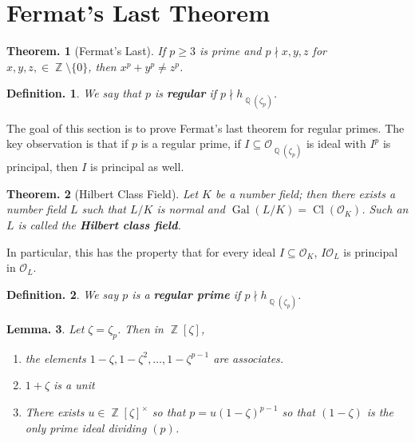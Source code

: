 \documentclass[11pt, a4paper]{memoir}
\DeclareMathOperator{\Q}{{\mathbb{Q}}}
\DeclareMathOperator{\Z}{{\mathbb{Z}}}
\theoremstyle{change}
\newtheorem{theorem}{Theorem.}[section]
\newtheorem{lemma}[theorem]{Lemma.}
\theoremstyle{plain}
\theoremstyle{nonumberplain}
\newtheorem{definition}{Definition.}
\DeclareMathOperator{\Gal}{Gal}
\DeclareMathOperator{\Cl}{Cl}
\newcommand{\mbf}[1]{{\boldmath\bfseries #1}}
\numberwithin{equation}{section}
\begin{document}
\section{Fermat's Last Theorem}
\begin{theorem}[Fermat's Last]
    If $p\geq 3$ is prime and $p\nmid x,y,z$ for $x,y,z,\in\Z\setminus\{0\}$, then $x^p+y^p\neq z^p$.
\end{theorem}
\begin{definition}
    We say that $p$ is \textbf{regular} if $p\nmid h_{\Q(\zeta_p)}$.
\end{definition}
The goal of this section is to prove Fermat's last theorem for regular primes.
The key observation is that if $p$ is a regular prime, if $I\subseteq\mathcal{O}_{\Q(\zeta_p)}$ is ideal with $I^p$ is principal, then $I$ is principal as well.
\begin{theorem}[Hilbert Class Field]
    Let $K$ be a number field; then there exists a number field $L$ such that $L/K$ is normal and $\Gal(L/K)=\Cl(\mathcal{O}_K)$.
    Such an $L$ is called the \textbf{Hilbert class field}.
\end{theorem}
In particular, this has the property that for every ideal $I\subseteq\mathcal{O}_K$, $I\mathcal{O}_L$ is principal in $\mathcal{O}_L$.
\begin{definition}
    We say $p$ is a \mbf{regular prime} if $p\nmid h_{\Q(\zeta_p)}$.
\end{definition}
\begin{lemma}\label{l:km}
    Let $\zeta=\zeta_p$.
    Then in $\Z[\zeta]$,
    \begin{enumerate}[nl,r]
        \item the elements $1-\zeta,1-\zeta^2,\ldots,1-\zeta^{p-1}$ are associates.
        \item $1+\zeta$ is a unit
        \item There exists $u\in\Z[\zeta]^\times$ so that $p=u(1-\zeta)^{p-1}$ so that $(1-\zeta)$ is the only prime ideal dividing $(p)$.
    \end{enumerate}
\end{lemma}
\end{document}
